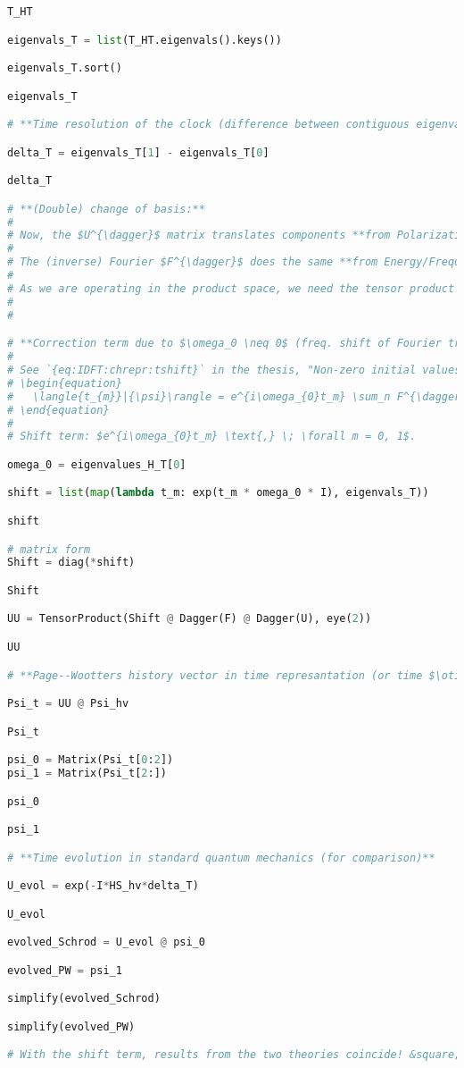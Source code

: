 \begin{lstlisting}[language=Python]
T_HT

eigenvals_T = list(T_HT.eigenvals().keys())

eigenvals_T.sort()

eigenvals_T

# **Time resolution of the clock (difference between contiguous eigenvalues)**

delta_T = eigenvals_T[1] - eigenvals_T[0]

delta_T

# **(Double) change of basis:**
#
# Now, the $U^{\dagger}$ matrix translates components **from Polarization into Energy/Frequency eigenbasis** representation in the clock space.
#
# The (inverse) Fourier $F^{\dagger}$ does the same **from Energy/Frequency into Time**.
#
# As we are operating in the product space, we need the tensor product by the Identity in the "system" space $\mathcal{H}_S$.
#
#

# **Correction term due to $\omega_0 \neq 0$ (freq. shift of Fourier transform)**
#
# See `{eq:IDFT:chrepr:tshift}` in the thesis, "Non-zero initial values":
# \begin{equation}
#   \langle{t_{m}}|{\psi}\rangle = e^{i\omega_{0}t_m} \sum_n F^{\dagger}_{mn} \langle{\omega_n}|{\psi}\rangle \text{.}
# \end{equation}
#
# Shift term: $e^{i\omega_{0}t_m} \text{,} \; \forall m = 0, 1$.

omega_0 = eigenvalues_H_T[0]

shift = list(map(lambda t_m: exp(t_m * omega_0 * I), eigenvals_T))

shift

# matrix form
Shift = diag(*shift)

Shift

UU = TensorProduct(Shift @ Dagger(F) @ Dagger(U), eye(2))

UU

# **Page--Wootters history vector in time represantation (or time $\otimes$ polarization, more correctly)**

Psi_t = UU @ Psi_hv

Psi_t

psi_0 = Matrix(Psi_t[0:2])
psi_1 = Matrix(Psi_t[2:])

psi_0

psi_1

# **Time evolution in standard quantum mechanics (for comparison)**

U_evol = exp(-I*HS_hv*delta_T)

U_evol

evolved_Schrod = U_evol @ psi_0

evolved_PW = psi_1

simplify(evolved_Schrod)

simplify(evolved_PW)

# With the shift term, results from the two theories coincide! &square;

\end{lstlisting}
